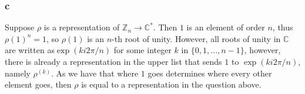\documentclass[]{article}
\begin{document}
\subsubsection*{c}
Suppose $\rho$ is a representation of $\mathbb{Z}_n \rightarrow \mathbb{C}^*$. Then $1$ is an element of order $n$, thus $\rho(1)^n = 1$, so $\rho(1)$ is an $n$-th root of unity. However, all roots of unity in $\mathbb{C}$ are written as$\exp(k i 2\pi/n)$ for some integer $k$ in $\lbrace 0, 1, ..., n-1 \rbrace$, however, there is already a representation in the upper list that sends $1$ to $ \exp(k i 2\pi/n)$, namely $\rho^{(k)}$. As we have that where $1$ goes determines where every other element goes, then $\rho$ is equal to a representation in the question above. 
\end{document}
